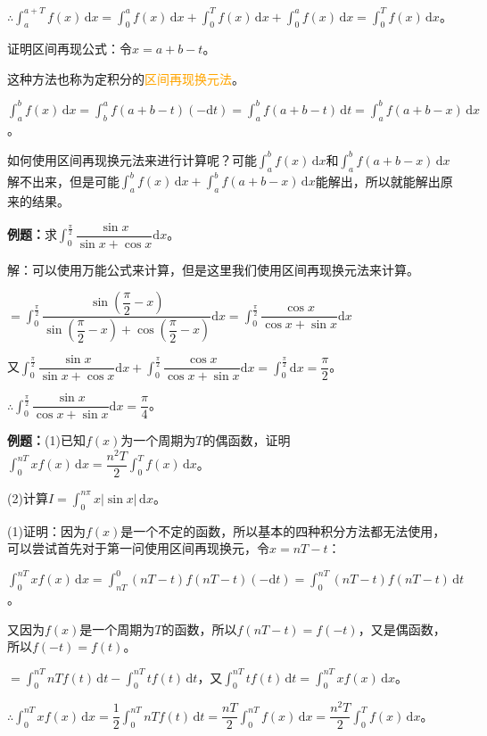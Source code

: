\documentclass[UTF8, 12pt]{ctexart}
\begin{document}
$\therefore\int_a^{a+T}f(x)\,\textrm{d}x=\int_0^af(x)\,\textrm{d}x+\int_0^Tf(x)\,\textrm{d}x+\int_0^af(x)\,\textrm{d}x=\int_0^Tf(x)\,\textrm{d}x$。

证明区间再现公式：令$x=a+b-t$。

这种方法也称为定积分的\textcolor{orange}{区间再现换元法}。

$\int_a^bf(x)\,\textrm{d}x=\int_b^af(a+b-t)(-\textrm{d}t)=\int_a^bf(a+b-t)\,\textrm{d}t=\int_a^bf(a+b-x)\,\textrm{d}x$。

如何使用区间再现换元法来进行计算呢？可能$\int_a^bf(x)\,\textrm{d}x$和$\int_a^bf(a+b-x)\,\textrm{d}x$解不出来，但是可能$\int_a^bf(x)\,\textrm{d}x+\int_a^bf(a+b-x)\,\textrm{d}x$能解出，所以就能解出原来的结果。

\textbf{例题：}求$\displaystyle{\int_0^\frac{\pi}{2}\dfrac{\sin x}{\sin x+\cos x}\textrm{d}x}$。

解：可以使用万能公式来计算，但是这里我们使用区间再现换元法来计算。

$=\displaystyle{\int_0^\frac{\pi}{2}\dfrac{\sin(\dfrac{\pi}{2}-x)}{\sin(\dfrac{\pi}{2}-x)+\cos(\dfrac{\pi}{2}-x)}\textrm{d}x=\int_0^\frac{\pi}{2}\dfrac{\cos x}{\cos x+\sin x}\textrm{d}x}$

又$\int_0^\frac{\pi}{2}\dfrac{\sin x}{\sin x+\cos x}\textrm{d}x+\int_0^\frac{\pi}{2}\dfrac{\cos x}{\cos x+\sin x}\textrm{d}x=\int_0^\frac{\pi}{2}\textrm{d}x=\dfrac{\pi}{2}$。

$\therefore\int_0^\frac{\pi}{2}\dfrac{\sin x}{\cos x+\sin x}\textrm{d}x=\dfrac{\pi}{4}$。

\textbf{例题：}(1)已知$f(x)$为一个周期为$T$的偶函数，证明$\int_0^{nT}xf(x)\,\textrm{d}x=\dfrac{n^2T}{2}\int_0^Tf(x)\,\textrm{d}x$。

(2)计算$I=\int_0^{n\pi}x\vert\sin x\vert\,\textrm{d}x$。

(1)证明：因为$f(x)$是一个不定的函数，所以基本的四种积分方法都无法使用，可以尝试首先对于第一问使用区间再现换元，令$x=nT-t$：

$\int_0^{nT}xf(x)\,\textrm{d}x=\int_{nT}^0(nT-t)f(nT-t)(-\textrm{d}t)=\int_0^{nT}(nT-t)f(nT-t)\,\textrm{d}t$。

又因为$f(x)$是一个周期为$T$的函数，所以$f(nT-t)=f(-t)$，又是偶函数，所以$f(-t)=f(t)$。

$=\int_0^{nT}nTf(t)\,\textrm{d}t-\int_0^{nT}tf(t)\,\textrm{d}t$，又$\int_0^{nT}tf(t)\,\textrm{d}t=\int_0^{nT}xf(x)\,\textrm{d}x$。

$\therefore\int_0^{nT}xf(x)\,\textrm{d}x=\dfrac{1}{2}\int_0^{nT}nTf(t)\,\textrm{d}t=\dfrac{nT}{2}\int_0^{nT}f(x)\,\textrm{d}x=\dfrac{n^2T}{2}\int_0^Tf(x)\,\textrm{d}x$。
\end{document}
